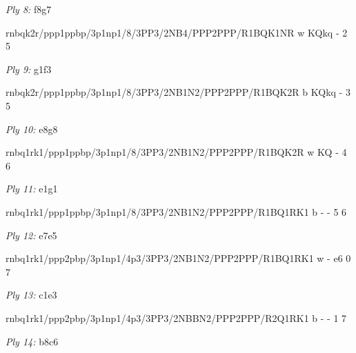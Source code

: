 \documentclass{article}
\begin{document}

\showboard

\bigskip

\emph{Ply 8:} f8g7

rnbqk2r/ppp1ppbp/3p1np1/8/3PP3/2NB4/PPP2PPP/R1BQK1NR w KQkq - 2 5


\showboard

\bigskip

\emph{Ply 9:} g1f3


rnbqk2r/ppp1ppbp/3p1np1/8/3PP3/2NB1N2/PPP2PPP/R1BQK2R b KQkq - 3 5


\showboard

\bigskip

\emph{Ply 10:} e8g8

rnbq1rk1/ppp1ppbp/3p1np1/8/3PP3/2NB1N2/PPP2PPP/R1BQK2R w KQ - 4 6


\showboard

\bigskip

\emph{Ply 11:} e1g1


rnbq1rk1/ppp1ppbp/3p1np1/8/3PP3/2NB1N2/PPP2PPP/R1BQ1RK1 b - - 5 6


\showboard

\bigskip

\emph{Ply 12:} e7e5

rnbq1rk1/ppp2pbp/3p1np1/4p3/3PP3/2NB1N2/PPP2PPP/R1BQ1RK1 w - e6 0 7


\showboard

\bigskip

\emph{Ply 13:} c1e3


rnbq1rk1/ppp2pbp/3p1np1/4p3/3PP3/2NBBN2/PPP2PPP/R2Q1RK1 b - - 1 7


\showboard

\bigskip

\emph{Ply 14:} b8c6
\end{document}
